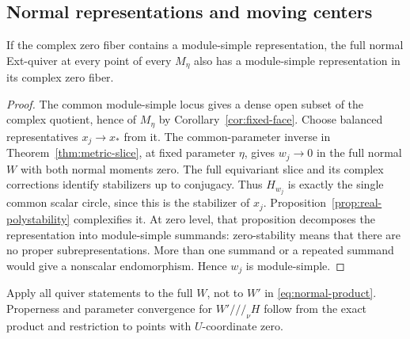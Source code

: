 \subsection{Normal representations and moving centers}
\begin{lemma}\label{lem:normal-simple}
If the complex zero fiber contains a module-simple representation,
the full normal Ext-quiver at
every point of every $M_\eta$ also has a module-simple representation
in its complex zero fiber.
\end{lemma}
\begin{proof}
The common module-simple locus gives a dense open subset of the
complex quotient, hence of $M_\eta$ by
Corollary~\ref{cor:fixed-face}. Choose balanced representatives
$x_j\to x_*$ from it. The common-parameter inverse in
Theorem~\ref{thm:metric-slice}, at fixed parameter $\eta$, gives
$w_j\to0$ in the full normal $W$ with both normal moments zero.
The full equivariant slice and its complex corrections identify
stabilizers up to conjugacy. Thus $H_{w_j}$ is exactly the single
common scalar circle, since this is the stabilizer of $x_j$.
Proposition~\ref{prop:real-polystability} complexifies it.
At zero level, that proposition decomposes the representation
into module-simple summands: zero-stability means that there are
no proper subrepresentations. More than one summand or a repeated
summand would give a nonscalar endomorphism. Hence $w_j$ is
module-simple.
\end{proof}

Apply all quiver statements to the full $W$, not to $W'$ in
\eqref{eq:normal-product}. Properness and parameter convergence
for $W'///_\nu H$ follow from the exact product and restriction
to points with $U$-coordinate zero.

